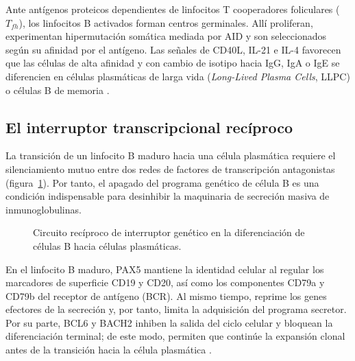 Ante antígenos proteicos dependientes de linfocitos T cooperadores foliculares ($T_{fh}$), los linfocitos B activados forman centros germinales. Allí proliferan, experimentan hipermutación somática mediada por AID y son seleccionados según su afinidad por el antígeno. Las señales de CD40L, IL-21 e IL-4 favorecen que las células de alta afinidad y con cambio de isotipo hacia IgG, IgA o IgE se diferencien en células plasmáticas de larga vida (\emph{Long-Lived Plasma Cells}, LLPC) o células B de memoria \parencite{tellier2019plasma,abbas2022cellular}.


\subsection{El interruptor transcripcional recíproco}
La transición de un linfocito B maduro hacia una célula plasmática requiere el silenciamiento mutuo entre dos redes de factores de transcripción antagonistas \parencite{shapiroshelef2005regulation} (figura~\ref{fig:circuito_transcripcional}). Por tanto, el apagado del programa genético de célula B es una condición indispensable para desinhibir la maquinaria de secreción masiva de inmunoglobulinas.

\begin{figure}[htbp]
\centering
{}
\caption{Circuito recíproco de interruptor genético en la diferenciación de células B hacia células plasmáticas.}
\label{fig:circuito_transcripcional}
\end{figure}


En el linfocito B maduro, PAX5 mantiene la identidad celular al regular los marcadores de superficie CD19 y CD20, así como los componentes CD79a y CD79b del receptor de antígeno (BCR). Al mismo tiempo, reprime los genes efectores de la secreción y, por tanto, limita la adquisición del programa secretor. Por su parte, BCL6 y BACH2 inhiben la salida del ciclo celular y bloquean la diferenciación terminal; de este modo, permiten que continúe la expansión clonal antes de la transición hacia la célula plasmática \parencite{nutt2015generation}.



